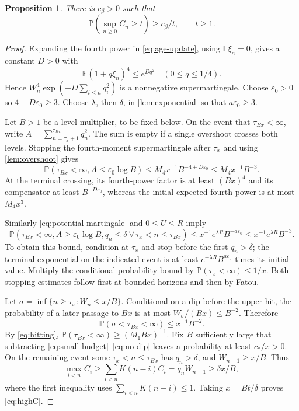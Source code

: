 \documentclass[11pt]{article}
\newtheorem{proposition}[proposition]{Proposition}
\theoremstyle{remark}
\numberwithin{equation}{section}
\newcommand{\E}{\mathbb E}
\newcommand{\Penv}{\mathbb P}
\begin{document}
\begin{proposition}\label{prop:highC}
There is $c_\beta>0$ such that
\begin{equation}\label{eq:highC}
 \Penv\left(\sup_{n\ge0}C_n\ge t\right)\ge c_\beta/t,
 \qquad t\ge1.
\end{equation}
\end{proposition}
\begin{proof}
Expanding the fourth power in \eqref{eq:age-update}, using $\E\xi_n=0$,
gives a constant $D>0$ with
\[
 \E(1+q\xi_n)^4\le e^{Dq^2}\quad(0\le q\le1/4).
\]
Hence $W_n^4\exp(-D\sum_{i\le n}q_i^2)$ is a nonnegative
supermartingale. Choose $\varepsilon_0>0$ so $4-D\varepsilon_0\ge3$.
Choose $\lambda$, then $\delta$, in \cref{lem:exponential} so that
$a\varepsilon_0\ge3$.

Let $B>1$ be a level multiplier, to be fixed below. On the event that
$\tau_{Bx}<\infty$, write $A=\sum_{n=\tau_x+1}^{\tau_{Bx}}q_n^2$.
The sum is empty if a single overshoot crosses both levels. Stopping the
fourth-moment supermartingale after $\tau_x$ and using
\cref{lem:overshoot} gives
\begin{equation}\label{eq:small-budget}
 \Penv(\tau_{Bx}<\infty,A\le\varepsilon_0\log B)
 \le M_4x^{-1}B^{-4+D\varepsilon_0}\le M_4x^{-1}B^{-3}.
\end{equation}
At the terminal crossing, its fourth-power factor is at least $(Bx)^4$
and its compensator at least $B^{-D\varepsilon_0}$, whereas the initial
expected fourth power is at most $M_4x^3$.

Similarly \eqref{eq:potential-martingale} and $0\le U\le R$ imply
\begin{equation}\label{eq:large-budget}
 \Penv\left(\tau_{Bx}<\infty,A\ge\varepsilon_0\log B,
       q_n\le\delta\ \forall\,\tau_x<n\le\tau_{Bx}\right)
 \le x^{-1}e^{\lambda R}B^{-a\varepsilon_0}
 \le x^{-1}e^{\lambda R}B^{-3}.
\end{equation}
To obtain this bound, condition at $\tau_x$ and stop before the first
$q_n>\delta$; the terminal exponential on the indicated event is at least
$e^{-\lambda R}B^{a\varepsilon_0}$ times its initial value. Multiply the
conditional probability bound by $\Penv(\tau_x<\infty)\le1/x$.
Both stopping estimates follow first at bounded horizons and then by Fatou.

Let $\sigma=\inf\{n\ge\tau_x:W_n\le x/B\}$. Conditional on a dip
before the upper hit, the probability of a later passage to $Bx$ is at most
$W_\sigma/(Bx)\le B^{-2}$. Therefore
\begin{equation}\label{eq:no-dip}
 \Penv(\sigma<\tau_{Bx}<\infty)\le x^{-1}B^{-2}.
\end{equation}
By \eqref{eq:hitting}, $\Penv(\tau_{Bx}<\infty)\ge(M_1Bx)^{-1}$.
Fix $B$ sufficiently large that subtracting
\eqref{eq:small-budget}--\eqref{eq:no-dip} leaves a probability at least
$c_*/x>0$. On the remaining event some $\tau_x<n\le\tau_{Bx}$ has
$q_n>\delta$, and $W_{n-1}\ge x/B$. Thus
\[
 \max_{i<n}C_i\ge\sum_{i<n}K(n-i)C_i=q_nW_{n-1}\ge\delta x/B,
\]
where the first inequality uses $\sum_{i<n}K(n-i)\le1$.
Taking $x=Bt/\delta$ proves \eqref{eq:highC}.
\end{proof}
\end{document}

